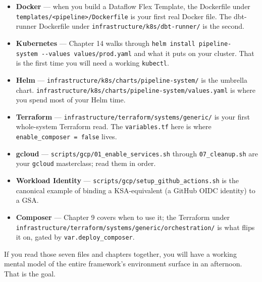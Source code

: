 \documentclass[
  11pt,
  british,
  oneside]{book}
\providecommand{\tightlist}{%
  \setlength{\itemsep}{0pt}\setlength{\parskip}{0pt}}
\begin{document}
\begin{itemize}
\tightlist
\item
  \textbf{Docker} --- when you build a Dataflow Flex Template, the
  Dockerfile under
  \texttt{templates/\textless{}pipeline\textgreater{}/Dockerfile} is
  your first real Docker file. The dbt-runner Dockerfile under
  \texttt{infrastructure/k8s/dbt-runner/} is the second.
\item
  \textbf{Kubernetes} --- Chapter 14 walks through
  \texttt{helm\ install\ pipeline-system\ -\/-values\ values/prod.yaml}
  and what it puts on your cluster. That is the first time you will need
  a working \texttt{kubectl}.
\item
  \textbf{Helm} --- \texttt{infrastructure/k8s/charts/pipeline-system/}
  is the umbrella chart.
  \texttt{infrastructure/k8s/charts/pipeline-system/values.yaml} is
  where you spend most of your Helm time.
\item
  \textbf{Terraform} ---
  \texttt{infrastructure/terraform/systems/generic/} is your first
  whole-system Terraform read. The \texttt{variables.tf} here is where
  \texttt{enable\_composer\ =\ false} lives.
\item
  \textbf{gcloud} --- \texttt{scripts/gcp/01\_enable\_services.sh}
  through \texttt{07\_cleanup.sh} are your \texttt{gcloud} masterclass;
  read them in order.
\item
  \textbf{Workload Identity} ---
  \texttt{scripts/gcp/setup\_github\_actions.sh} is the canonical
  example of binding a KSA-equivalent (a GitHub OIDC identity) to a GSA.
\item
  \textbf{Composer} --- Chapter 9 covers when to use it; the Terraform
  under \texttt{infrastructure/terraform/systems/generic/orchestration/}
  is what flips it on, gated by \texttt{var.deploy\_composer}.
\end{itemize}

If you read those seven files and chapters together, you will have a
working mental model of the entire framework's environment surface in an
afternoon. That is the goal.
\end{document}
